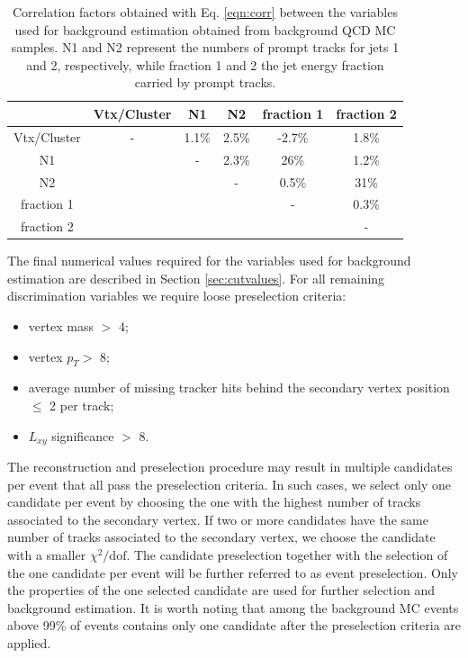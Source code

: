 \begin{table}[htbp]
\centering
\caption{Correlation factors obtained with Eq. \ref{eqn:corr} between the variables 
used for background estimation obtained from background QCD MC
samples. N1 and N2 represent the numbers
of prompt tracks for jets 1 and 2, respectively, while fraction 1 and 2 the jet energy fraction carried by
prompt tracks.
\label{tab:corr}}
\begin{tabular}{c|ccccc}
 & Vtx/Cluster & N1 & N2 & fraction 1 & fraction 2 \\
\hline
Vtx/Cluster & - & 1.1\% & 2.5\% & -2.7\% & 1.8\%  \\
N1 & & - & 2.3\% & 26\%  & 1.2\% \\
N2 & & & - & 0.5\% & 31\% \\
fraction 1 & & & & - & 0.3\% \\
fraction 2 & & & & & - \\
\end{tabular}
\end{table}

The final numerical values required for the variables used for background estimation are described in Section 
\ref{sec:cutvalues}. For all remaining discrimination variables we require loose preselection criteria:   
\begin{itemize}
 \item vertex mass $>$ 4\GeV;
 \item vertex $p_T>$ 8\GeV;
 \item average number of missing tracker hits behind the secondary vertex position $\leq$ 2 per track;
 \item $L_{xy}$ significance $>$ 8.
\end{itemize}

The reconstruction and preselection procedure 
may result in multiple candidates per event that all pass
the preselection criteria. In such cases, we select only one candidate per event by
choosing the one with the highest number of tracks associated to the secondary vertex.
If two or more candidates have the same number of tracks associated to the secondary vertex,
we choose the candidate with a smaller $\chi^2/\text{dof}$. The candidate preselection together
with the selection of the 
one candidate per event will be further referred to as event preselection.
Only the 
properties of the one selected candidate are used for further selection and background estimation.
It is worth noting that
among the background MC events above 99\% of events contains only one candidate
after the preselection criteria are applied. 

